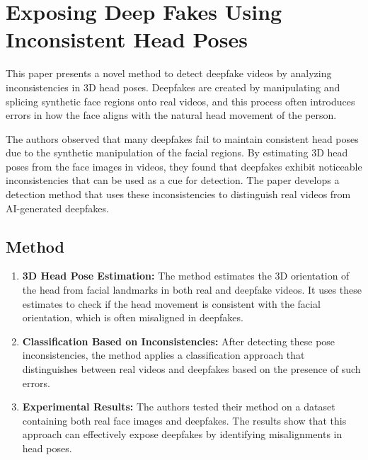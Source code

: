 \documentclass{report}
\begin{document}
	
	
	
	
	
	
	
	
	
	
	
	
	
	
	\chapter{Exposing Deep Fakes Using Inconsistent Head Poses \cite{DBLP:journals/corr/abs-1811-00661}}
	This paper presents a novel method to detect deepfake videos by analyzing inconsistencies in 3D head poses. Deepfakes are created by manipulating and splicing synthetic face regions onto real videos, and this process often introduces errors in how the face aligns with the natural head movement of the person.
	
	The authors observed that many deepfakes fail to maintain consistent head poses due to the synthetic manipulation of the facial regions. By estimating 3D head poses from the face images in videos, they found that deepfakes exhibit noticeable inconsistencies that can be used as a cue for detection. The paper develops a detection method that uses these inconsistencies to distinguish real videos from AI-generated deepfakes.
	
	
	\section{Method}
	\begin{enumerate}
		\item 
		\textbf{3D Head Pose Estimation:} The method estimates the 3D orientation of the head from facial landmarks in both real and deepfake videos. It uses these estimates to check if the head movement is consistent with the facial orientation, which is often misaligned in deepfakes.
		
		\item 
		\textbf{Classification Based on Inconsistencies:} After detecting these pose inconsistencies, the method applies a classification approach that distinguishes between real videos and deepfakes based on the presence of such errors.
		
		\item 
		\textbf{Experimental Results:} The authors tested their method on a dataset containing both real face images and deepfakes. The results show that this approach can effectively expose deepfakes by identifying misalignments in head poses.
	\end{enumerate}
	
\end{document}
